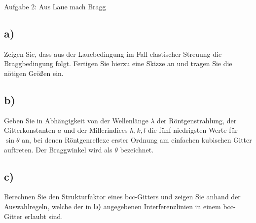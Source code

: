 \begin{aufgabe}{Aufgabe 2: Aus Laue mach Bragg}
    \subsection{a)}
    Zeigen Sie, dass aus der Lauebedingung im Fall elastischer Streuung die Braggbedingung folgt.
    Fertigen Sie hierzu eine Skizze an und tragen Sie die nötigen Größen ein.

    \subsection{b)}
    Geben Sie in Abhängigkeit von
    der Wellenlänge $\lambda$ der Röntgenstrahlung,
    der Gitterkonstanten $a$
    und der Millerindices $h, k, l$
    die fünf niedrigsten Werte für $\sin\theta$ an,
    bei denen Röntgenreflexe erster Ordnung am einfachen kubischen Gitter auftreten.
    Der Braggwinkel wird als $\theta$ bezeichnet.

    \subsection{c)}
    Berechnen Sie den Strukturfaktor eines bcc-Gitters und zeigen Sie anhand der Auswahlregeln,
    welche der in \textbf{b)} angegebenen Interferenzlinien in einem bcc-Gitter erlaubt sind.
\end{aufgabe}


